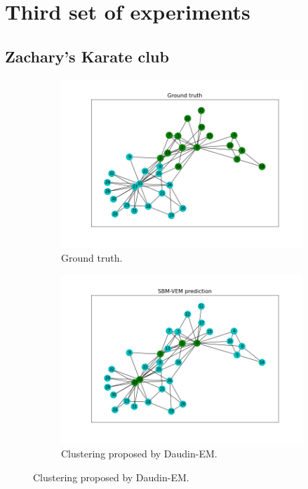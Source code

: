 \documentclass[switch, 12pt]{article}
\begin{document}
\newpage

\section{Third set of experiments}
\label{app:real}

\subsection{Zachary's Karate club}
\label{app:zachary}

\hphantom{.}

\begin{figure}[h]
    \centering
    \begin{subfigure}{0.42\linewidth}
        \centering
        \includegraphics[width=\linewidth, trim={45 35 35 60}, clip]{figures/karate_club_gt.png}
        \caption{Ground truth.}
        \label{fig:zachary_gt}
    \end{subfigure}
    \hspace{1em}
    \begin{subfigure}{0.42\linewidth}
        \centering
        \includegraphics[width=\linewidth, trim={45 35 35 60}, clip]{figures/karate_club_sbm.png}
        \caption{Clustering proposed by Daudin-EM.}
        \label{fig:zachary_SBM}
    \end{subfigure}


\end{figure}
\end{document}
